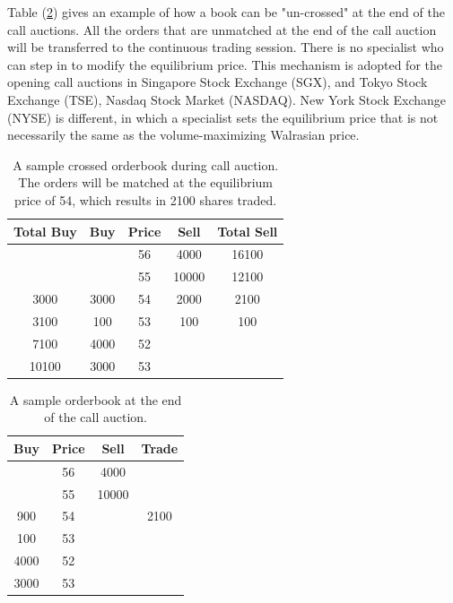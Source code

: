 \documentclass{article}
\begin{document}
Table (\ref{itayoseTable2}) gives an example of how a book can be "un-crossed" at the end of the call auctions. All the orders that are unmatched at the end of the call auction will be transferred to the continuous trading session. There is no specialist who can step in to modify the equilibrium price. This mechanism is adopted for the opening call auctions in Singapore Stock Exchange (SGX), and Tokyo Stock Exchange (TSE), Nasdaq Stock Market (NASDAQ). New York Stock Exchange (NYSE) is different, in which a specialist sets the equilibrium price that is not necessarily the same as the volume-maximizing Walrasian price.

\begin{table}[]
  \centering
  \begin{tabular}{c|c|c|c|c}
    \hline
    \textbf{Total Buy} & \textbf{Buy} & \textbf{Price} & \textbf{Sell} & \textbf{Total Sell} \\ \hline
                       &              & 56             & 4000          & 16100               \\ \hline
                       &              & 55             & 10000         & 12100               \\ \hline
    3000               & 3000         & 54             & 2000          & 2100                \\ \hline
    3100               & 100          & 53             & 100           & 100                 \\ \hline
    7100               & 4000         & 52             &               &                     \\ \hline
    10100              & 3000         & 53             &               &                     \\ \hline
  \end{tabular}

  \caption{A sample crossed orderbook during call auction. The orders will be matched at the equilibrium price of 54, which results in 2100 shares traded.}
  \label{itayoseTable1}
\end{table}


\begin{table}[]
  \centering
  \begin{tabular}{c|c|c|c}
    \hline
    \textbf{Buy} & \textbf{Price} & \textbf{Sell} & \textbf{Trade} \\ \hline
                 & 56             & 4000          &                \\ \hline
                 & 55             & 10000         &                \\ \hline
    900          & 54             &               & 2100           \\ \hline
    100          & 53             &               &                \\ \hline
    4000         & 52             &               &                \\ \hline
    3000         & 53             &               &                \\ \hline
  \end{tabular}
  \caption{A sample orderbook at the end of the call auction.}
  \label{itayoseTable2}
\end{table}
\end{document}
